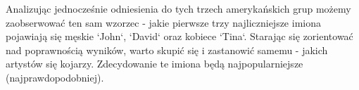 \documentclass[journal]{article}
\begin{document}
 \renewcommand{\namefile}{../Lucene_project/results/cat_name/cat_name_American_blues_rock.csv}
 \renewcommand{\titleplot}{Najcześciej występujące imiona i nazwiska dla grupy 'American blues rock'}
 \renewcommand{\column}{Name}
 \renewcommand{\labx}{Imiona i nazwiska}
 \renewcommand{\laby}{Wystąpienia}
 
 \renewcommand{\namefile}{../Lucene_project/results/cat_name/cat_name_American_blues.csv}
 \renewcommand{\titleplot}{Najcześciej występujące imiona i nazwiska dla grupy 'American blues'}
 
 \renewcommand{\namefile}{../Lucene_project/results/cat_name/cat_name_American_instrumental.csv}
 \renewcommand{\titleplot}{Najcześciej występujące imiona i nazwiska dla grupy 'American instrumental'}
 
Analizując jednocześnie odniesienia do tych trzech amerykańskich grup możemy zaobserwować ten sam wzorzec -
 jakie pierwsze trzy najliczniejsze imiona pojawiają się męskie `John`, `David` oraz kobiece `Tina`.
Starając się zorientować nad poprawnością wyników, warto skupić się i zastanowić samemu -
jakich artystów się kojarzy. Zdecydowanie te imiona będą najpopularniejsze (najprawdopodobniej).
\end{document}
